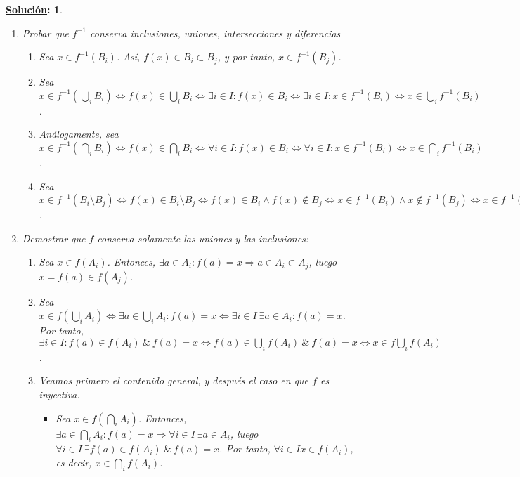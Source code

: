 \documentclass[10pt,a4paper,openright]{book}
\theoremstyle{break}
\newtheorem*{ej}{\underline{Solución}:}
\begin{document}
\begin{ej}
\begin{enumerate}[label={(\arabic*)}]
 \item Probar que $f^{-1}$ conserva inclusiones, uniones, intersecciones y diferencias
 \begin{enumerate}[label={(\alph*)}]
 \item Sea $x \in f^{-1}(B_i)$. Así, $f(x) \in B_i \subset B_j$, y por tanto, $x \in f^{-1}(B_j)$.
 \item Sea $x \in f^{-1}(\bigcup_i B_i) \Leftrightarrow f(x) \in \bigcup_i B_i \Leftrightarrow \exists i \in I : f(x) \in B_i \Leftrightarrow \exists i \in I : x \in f^{-1} (B_i) \Leftrightarrow x \in \bigcup_i f^{-1}(B_i)$.
 \item  Análogamente, sea $x \in f^{-1}(\bigcap_i B_i) \Leftrightarrow f(x) \in \bigcap_i B_i \Leftrightarrow \forall i \in I : f(x) \in B_i \Leftrightarrow \forall i \in I : x \in f^{-1} (B_i) \Leftrightarrow x \in \bigcap_i f^{-1}(B_i)$.
 \item  Sea $x \in f^{-1} (B_i \setminus B_j) \Leftrightarrow f(x) \in B_i \setminus B_j \Leftrightarrow f(x) \in B_i \wedge f(x) \notin B_j \Leftrightarrow x \in  f^{-1}(B_i) \wedge x \notin  f^{-1}(B_j) \Leftrightarrow x \in  f^{-1}(B_i) \setminus  f^{-1}(B_j)$.
 \end{enumerate}
 \item Demostrar que $f$ conserva solamente las uniones y las inclusiones:
 \begin{enumerate}[label={(\alph*)}]
 \item  Sea $x \in f(A_i)$. Entonces, $\exists a \in A_i : f(a) = x \Rightarrow a \in A_i \subset A_j$, luego $x = f(a) \in f(A_j)$.
 \item Sea $x \in f(\bigcup_i A_i) \Leftrightarrow \exists a \in \bigcup_i A_i : f(a) = x \Leftrightarrow \exists i \in I \ \exists a \in A_i : f(a) = x$. Por tanto, $\exists i \in I : f(a) \in f(A_i) \ \& \ f(a) = x  \Leftrightarrow f(a) \in \bigcup_i f(A_i) \ \& \ f(a) = x \Leftrightarrow x \in f\bigcup_i f(A_i)$.
 \item Veamos primero el contenido general, y después el caso en que $f$ es inyectiva.
 \begin{itemize}
 \item Sea $x \in f(\bigcap_i A_i)$. Entonces, $\exists a \in \bigcap_i A_i : f(a) = x \Rightarrow \forall i \in I \ \exists a \in A_i$, luego $\forall i \in I \ \exists f(a) \in f(A_i) \ \& \ f(a) =x$. Por tanto, $\forall i \in I x \in f(A_i)$, es decir, $x \in \bigcap_i f(A_i)$.

\end{itemize}
\end{enumerate}
\end{enumerate}
\end{ej}
\end{document}
